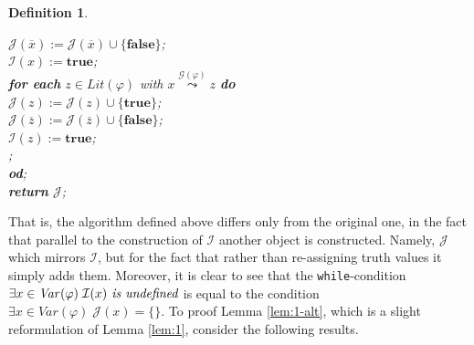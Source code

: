 \documentclass [11pt]{article}
\renewcommand{\phi}{\varphi}
\def\II{{\cal I}}
\newcommand{\True}{\mathbf{true}}
\newcommand{\False}{\mathbf{false}}
\newcommand{\var}{\mathit{Var}}
\newcommand{\lit}{\mathit{Lit}}
\newtheorem{lemma}[theorem]{Lemma}
\newtheorem{definition}[theorem]{Definition}
\newcommand{\reach}{\leadsto}
\newcommand{\sreach}[1]{\stackrel{#1}{\leadsto}}
\begin{document}
\begin{definition}
\begin{tabbing}
\> $\mathcal{J}(\overline{x}) := \mathcal{J}(\overline{x}) \cup \{ \False\}$; \\
\> $\mathcal{I}(x) := \True$; \\
\> {\bf for each} $z\in \lit(\varphi)$ with $x  \sreach{\mathcal{G}(\varphi)} z$   {\bf do} \\
\>\> $\mathcal{J}(z) := \mathcal{J}(z) \cup \{ \True\}$; \\
\>\> $\mathcal{J}(\overline{z}) := \mathcal{J}(\overline{z}) \cup \{ \False\}$; \\
\>\> $\mathcal{I}(z) := \True$; \\
;\\
{\bf od};\\
{\bf return} $\mathcal{J}$;
\end{tabbing}
\end{definition}

That is, the algorithm defined above differs only from the original one, in the fact that parallel to the construction of $\mathcal{I}$ another object is constructed. Namely, $\mathcal{J}$ which mirrors $\mathcal{I}$, but for the fact that rather than re-assigning truth values it simply adds them.  Moreover, it is clear to see that the \texttt{while}-condition $\exists x \in \var(\phi) \; \II(x) \textit{ is undefined}$ is equal to the condition $\exists x \in\var(\phi) \; \mathcal{J}(x)=\{\}$. 
To proof Lemma \ref{lem:1-alt}, which is a slight reformulation of Lemma \ref{lem:1}, consider the following results.




%
\end{document}
